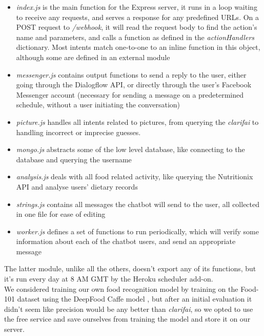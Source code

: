 \begin{itemize}
  \item \textit{index.js} is the main function for the Express server, it runs in a loop waiting to receive any requests, and serves a response for any predefined URLs. On a POST request to \textit{/webhook}, it will read the request body to find the action's name and parameters, and calls a function as defined in the \textit{actionHandlers} dictionary. Most intents match one-to-one to an inline function in this object, although some are defined in an external module
  \item \textit{messenger.js} contains output functions to send a reply to the user, either going through the Dialogflow API, or directly through the user's Facebook Messenger account (necessary for sending a message on a predetermined schedule, without a user initiating the conversation)
  \item \textit{picture.js} handles all intents related to pictures, from querying the \textit{clarifai} to handling incorrect or imprecise guesses.
  \item \textit{mongo.js} abstracts some of the low level database, like connecting to the database and querying the username
  \item \textit{analysis.js} deals with all food related activity, like querying the Nutritionix API and analyse users' dietary records
  \item \textit{strings.js} contains all messages the chatbot will send to the user, all collected in one file for ease of editing
  \item \textit{worker.js} defines a set of functions to run periodically, which will verify some information about each of the chatbot users, and send an appropriate message
\end{itemize}
The latter module, unlike all the others, doesn't export any of its functions, but it's run every day at 8 AM GMT by the Heroku scheduler add-on.\\
We considered training our own food recognition model by training on the Food-101 dataset using the DeepFood Caffe model \cite{liu2016deepfood}, but after an initial evaluation it didn't seem like precision would be any better than \textit{clarifai}, so we opted to use the free service and save ourselves from training the model and store it on our server.
